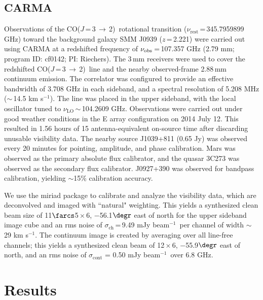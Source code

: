 \documentclass[iop, revtex4]{emulateapj}
\newcommand{\CO}{\mbox{CO($J$\,=\,3\,$\rightarrow$\,2) }}
\newcommand{\pmOne}{\mbox{$^{-1}$}}
\begin{document}
\subsection{CARMA} \label{sec:carmadata}
Observations of the \CO rotational transition ($\nu_\textrm{rest}$\,=\,345.7959899 GHz) toward the background galaxy SMM
J0939 ($z$\,=\,2.221) were carried out using CARMA at a redshifted frequency of $\nu_{\rm obs}$\,=\,107.357\,\,GHz (2.79\,\,mm; program ID: cf0142; PI: Riechers). The 3\,mm receivers were used to cover the redshifted \CO line and the nearby observed-frame 2.88\,mm continuum emission. The correlator was configured to provide an effective bandwidth of 3.708 GHz in each sideband, and a spectral resolution of 5.208 MHz ($\sim$\,14.5 km\,\,s\pmOne).
The line was placed in the
upper sideband, with the local oscillator tuned to $\nu_\textrm{LO}$\,$\sim$\,104.2609 GHz.
Observations were carried out under good
weather conditions in the E array configuration on 2014 July 12. This resulted in 1.56 hours of 15 antenna-equivalent on-source time after discarding unusable visibility data.
The nearby source J1039+811 (0.65\,\,Jy) was observed every 20 minutes for
pointing, amplitude, and phase calibration. Mars was observed as the primary
absolute flux calibrator, and the quasar 3C273 was observed as the secondary
flux calibrator. J0927+390 was observed for bandpass calibration, yielding $\sim
$15\% calibration accuracy. \par
We use the {\sc miriad} package to calibrate and analyze the visibility data, which are deconvolved and imaged with ``natural" weighting.
This yields a synthesized clean beam size of 11$\farcs$5\,$\times$\,6, $-$56.1$\degr$ east of north for the upper sideband image cube and an rms noise of $\sigma_\textrm{ch}$\,=\,9.49\,\,mJy\,\,beam\pmOne\ per channel
of width $\sim$\,29 km\,\,s\pmOne.
The continuum image is created by
averaging over all line-free channels; this yields a synthesized clean beam of 12\,$\times$\,6, $-$55.9$\degr$ east of north, and an rms noise of $\sigma_\textrm{cont}$ = 0.50\,\,mJy\,\,beam\pmOne\ over 6.8 GHz.

\section{Results}\label{sec:res}
\end{document}
